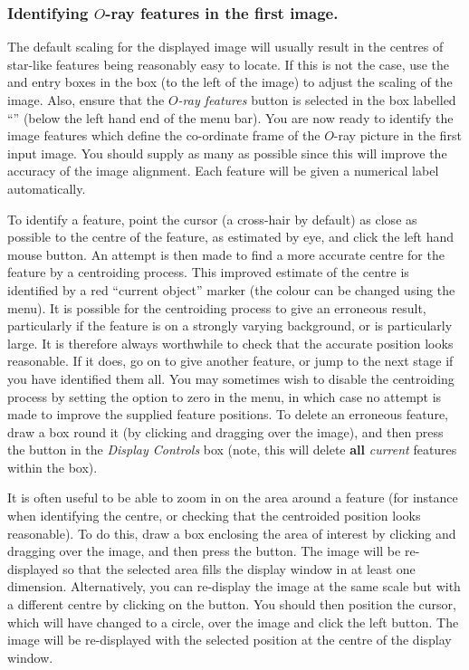 \documentclass[11pt,nolof]{starlink}
\begin{document}
\subsubsection {Identifying $O$-ray features in the first image.}
The default scaling for the displayed image will usually result in the
centres of star-like features being reasonably easy to locate. If this is
not the case, use the  and
 entry boxes
in the  box
(to the left of the image) to adjust the scaling of the image. Also,
ensure that the \emph{$O$-ray features} button is selected in the box
labelled ``'' (below the left hand
end of the menu bar). You are now ready to identify the image features
which define the co-ordinate frame of the $O$-ray picture in the first
input image. You should supply as many as possible since this will
improve the accuracy of the image alignment. Each feature will be given a
numerical label automatically.

To identify a feature, point the cursor (a cross-hair by default) as
close as possible to the centre of the feature, as estimated by eye, and
click the left hand mouse button. An attempt is then made to find a more
accurate centre for the feature by a centroiding process. This improved
estimate of the centre is identified by a red ``current object'' marker
(the colour can be changed using the  menu). It is possible for the centroiding
process to give an erroneous result, particularly if the feature is on a
strongly varying background, or is particularly large. It is therefore
always worthwhile to check that the accurate position looks reasonable.
If it does, go on to give another feature, or jump to the next stage if
you have identified them all. You may sometimes wish to disable the
centroiding process by setting the  option to zero in the  menu, in which case no attempt is made to
improve the supplied feature positions. To delete an erroneous feature,
draw a box round it (by clicking and dragging over the image), and then
press the  button in the \emph{Display Controls} box (note, this will delete \textbf{all} \emph{current}
features within the box).

It is often useful to be able to zoom in on the area around a feature
(for instance when identifying the centre, or checking that the
centroided position looks reasonable). To do this, draw a box enclosing
the area of interest by clicking and dragging over the image, and then
press the  button. The image will be
re-displayed so that the selected area fills the display window in at
least one dimension. Alternatively, you can re-display the image at the
same scale but with a different centre by clicking on the  button. You should then position the cursor,
which will have changed to a circle, over the image and click the
left button. The image will be re-displayed with the selected position at
the centre of the display window.
\end{document}
